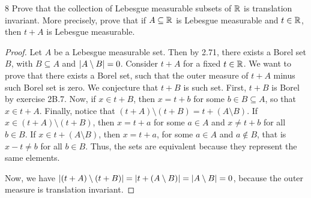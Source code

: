 \begin{exercise}{8}
Prove that the collection of Lebesgue measurable subsets of $\mathbb{R}$ is translation invariant.
More precisely, prove that if $A \subseteq \mathbb{R}$ is Lebesgue measurable and $t \in \mathbb{R}$, then $t+A$ is Lebesgue measurable.
\end{exercise}
\begin{proof}
Let $A$ be a Lebesgue measurable set.
Then by 2.71, there exists a Borel set $B$, with $B \subseteq A$ and $\left\lvert A \setminus B\right\rvert=0$.
Consider $t+A$ for a fixed $t\in\mathbb{R}$.
We want to prove that there exists a Borel set, such that the outer measure of $t+A$ minus such Borel set is zero.
We conjecture that $t+B$ is such set.
First, $t+B$ is Borel by exercise 2B.7.
Now, if $x\in t+B$, then $x = t+b$ for some $b \in B \subseteq A$, so that $x \in t+A$.
Finally, notice that $(t + A) \setminus (t + B) = t + (A \setminus B)$.
If $x \in (t + A) \setminus (t + B)$, then $x = t + a$ for some $a \in A$ and $x \neq t + b$ for all $b \in B$.
If $x \in t + (A \setminus B)$, then $x = t + a$, for some  $a \in A$ and $a \notin B$, that is $x - t \neq b$ for all $b \in B$.
Thus, the sets are equivalent because they represent the same elements.

Now, we have $\left\lvert (t+A) \setminus (t + B)\right\rvert = \left\lvert t + (A \setminus B)\right\rvert = \left\lvert A \setminus B\right\rvert = 0$, because the outer measure is translation invariant.
\end{proof} 

